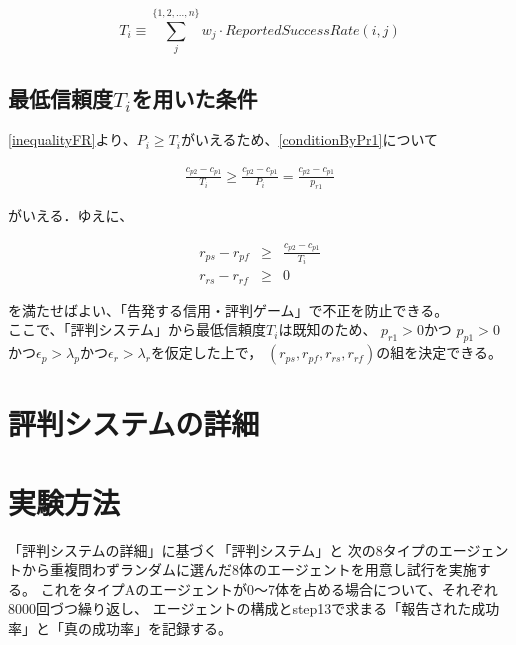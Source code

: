 \begin{equation}
  T_i \equiv \sum^{\{1,2,..., n\}}_{j} w_j \cdot ReportedSuccessRate(i, j) \label{conditionT_i}
\end{equation}

\subsection{最低信頼度$T_i$を用いた条件}

\eqref{inequalityFR}より、$ P_i \geq T_i $がいえるため、\eqref{conditionByPr1}について

\begin{eqnarray}
  \frac{c_{p2} - c_{p1}}{T_i} \geq \frac{c_{p2} - c_{p1}}{P_i} = \frac{c_{p2} - c_{p1}}{p_{r1}} \nonumber
\end{eqnarray}

がいえる．ゆえに、

\begin{eqnarray}
  r_{ps} - r_{pf} &\geq& \frac{c_{p2} - c_{p1}}{T_i} \label{condition6-1} \\
  r_{rs} - r_{rf} &\geq& 0 \label{condition6-2}
\end{eqnarray}

を満たせばよい、「告発する信用・評判ゲーム」で不正を防止できる。\\

ここで、「評判システム」から最低信頼度$T_i$は既知のため、
$p_{r1} > 0$かつ $p_{p1} > 0$かつ$ \epsilon_p > \lambda_p $かつ$ \epsilon_r > \lambda_r $を仮定した上で，
$ (r_{ps}, r_{pf}, r_{rs}, r_{rf}) $の組を決定できる。

\section{評判システムの詳細}


\section{実験方法}
「評判システムの詳細」に基づく「評判システム」と
次の8タイプのエージェントから重複問わずランダムに選んだ8体のエージェントを用意し試行を実施する。
これをタイプAのエージェントが0〜7体を占める場合について、それぞれ8000回づつ繰り返し、
エージェントの構成とstep13で求まる「報告された成功率」と「真の成功率」を記録する。

